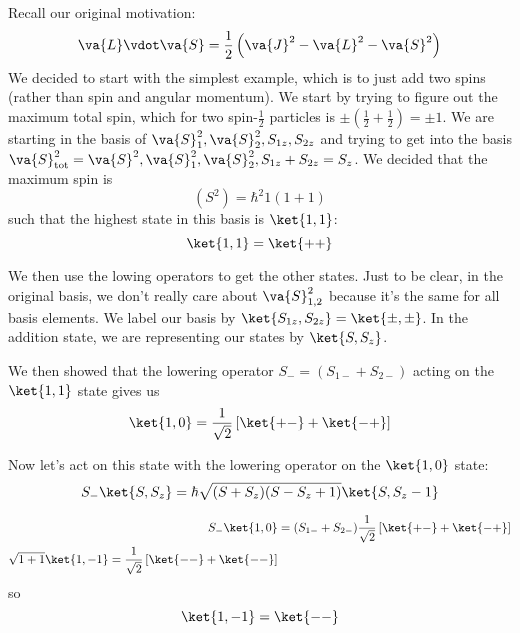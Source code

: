\documentclass[a4paper,twoside,master.tex]{subfiles}
\begin{document}

Recall our original motivation:
\begin{equation}
    \va{L} \vdot \va{S} = \frac{1}{2} \left( \va{J}^2 - \va{L}^2 - \va{S}^2 \right)
\end{equation}
We decided to start with the simplest example, which is to just add two spins (rather than spin and angular momentum). We start by trying to figure out the maximum total spin, which for two spin-$ \frac{1}{2} $ particles is $ \pm \left(\frac{1}{2} + \frac{1}{2} \right) = \pm 1 $. We are starting in the basis of $ \va{S}_1^2, \va{S}_2^2, S_{1z}, S_{2z} $ and trying to get into the basis $ \va{S}^2_{\text{tot}} = \va{S}^2, \va{S}_1^2, \va{S}_2^2, S_{1z} + S_{2z} = S_z $. We decided that the maximum spin is
\begin{equation}
    (S^2)= \hbar^2 1(1+1)
\end{equation}
such that the highest state in this basis is $\ket{1,1} $:
\begin{equation}
    \ket{1,1} =\ket{++}
\end{equation}

We then use the lowing operators to get the other states. Just to be clear, in the original basis, we don't really care about $ \va{S}^2_{1,2} $ because it's the same for all basis elements. We label our basis by $\ket{S_{1z}, S_{2z}} =\ket{\pm,\pm} $. In the addition state, we are representing our states by $\ket{S, S_z} $.

We then showed that the lowering operator $ S_- = (S_{1-} + S_{2-}) $ acting on the $\ket{1,1} $ state gives us
\begin{equation}
    \ket{1,0} = \frac{1}{\sqrt{2}} \left[\ket{+-} +\ket{-+} \right]
\end{equation}

Now let's act on this state with the lowering operator on the $\ket{1,0} $ state:
\begin{equation}
    S_-\ket{S, S_z} = \hbar \sqrt{(S+S_z)(S - S_z + 1)}\ket{S, S_z-1}
\end{equation}

\begin{align}
    S_-\ket{1,0} &= (S_{1-} + S_{2-}) \frac{1}{\sqrt{2}} \left[\ket{+-} +\ket{-+} \right] \\
    \sqrt{1+1}\ket{1,-1} = \frac{1}{\sqrt{2}} \left[\ket{--} +\ket{--} \right]
\end{align}
so
\begin{equation}
    \ket{1,-1} =\ket{--}
\end{equation}
\end{document}
